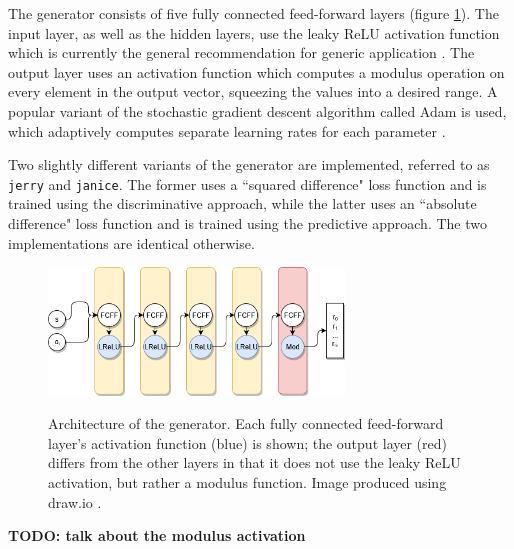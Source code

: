 \documentclass[12pt, titlepage]{report}
\theoremstyle{definition}
\begin{document}
The generator consists of five fully connected feed-forward layers (figure \ref{figure:architecture_generator}). The input layer, as well as the hidden layers, use the leaky ReLU activation function which is currently the general recommendation for generic application \cite[Neural Networks Part 1: Setting up the Architecture]{karpathy2017cs231n}. The output layer uses an activation function which computes a modulus operation on every element in the output vector, squeezing the values into a desired range. A popular variant of the stochastic gradient descent algorithm called Adam is used, which adaptively computes separate learning rates for each parameter \cite{kingma2014adam} \cite[Optimization: Stochastic Gradient Descent]{karpathy2017cs231n}.

Two slightly different variants of the generator are implemented, referred to as \texttt{jerry} and \texttt{janice}. The former uses a ``squared difference" loss function and is trained using the discriminative approach, while the latter uses an ``absolute difference" loss function and is trained using the predictive approach. The two implementations are identical otherwise.

\begin{figure}
\centering
\includegraphics[width=0.7\textwidth]{img/generator.png}\\
\caption{Architecture of the generator. Each fully connected feed-forward layer's activation function (blue) is shown; the output layer (red) differs from the other layers in that it does not use the leaky ReLU activation, but rather a modulus function. Image produced using draw.io \cite{jgraph2018draw}.}
\label{figure:architecture_generator}
\end{figure}

\textbf{TODO: talk about the modulus activation}
\end{document}
